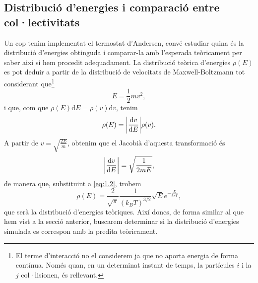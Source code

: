 \documentclass[a4paper,10.5pt]{report}
\begin{document}
\subsection{Distribució d'energies i comparació entre col·lectivitats}
Un cop tenim implementat el termostat d'Andersen, convé estudiar quina és la distribució d'energies obtinguda i comparar-la amb l'esperada teòricament per saber així si hem procedit adequadament. La distribució teòrica d'energies $\rho(E)$ es pot deduir a partir de la distribució de velocitats de Maxwell-Boltzmann tot considerant que\footnote{El terme d'interacció no el considerem ja que no aporta energia de forma contínua. Només quan, en un determinat instant de temps, la partícules $i$ i la $j$ col·lisionen, és rellevant.}
\begin{equation}
	E = \frac{1}{2}mv^2,
\end{equation}
i que, com que $\rho(E)\mathrm{d}E = \rho(v)\mathrm{d}v$, tenim
\begin{equation}
	\rho(E) = \abs{\frac{\mathrm{d}v}{\mathrm{d}E}}\rho(v).
\end{equation}
A partir de $v = \sqrt{\frac{2E}{m}}$, obtenim que el Jacobià d'aquesta transformació és
\begin{equation}
	\abs{\frac{\mathrm{d}v}{\mathrm{d}E}} = \sqrt{\frac{1}{2mE}},
\end{equation}
de manera que, substituint a \eqref{eq:1.2}, trobem
\begin{equation}
	\rho(E) = \frac{2}{\sqrt{\pi}}\frac{1}{(k_B T)^{3/2}}\sqrt{E}e^{-\frac{E}{k_BT}},
\end{equation}
que serà la distribució d'energies teòriques. Així doncs, de forma similar al que hem vist a la secció anterior, buscarem determinar si la distribució d'energies simulada es correspon amb la predita teòricament.
\end{document}
